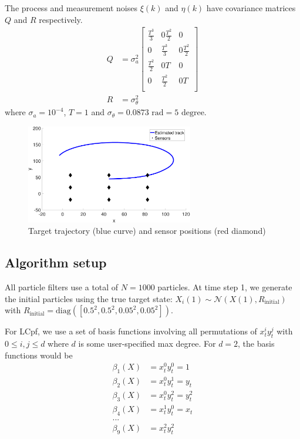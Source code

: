 \documentclass[10pt,letterpaper,final]{article}
\begin{document}
The process and measurement noises $\xi(k)$ and $\eta(k)$ have covariance matrices $Q$ and $R$ respectively.
\begin{align}
Q &= \sigma_a^2
\left[
\begin{array}{cccc}
\frac{T^3}{3} & 0 \frac{T^2}{2} & 0 \\
0 & \frac{T^3}{3} & 0 \frac{T^2}{2} \\
\frac{T^2}{2} & 0 T & 0 \\
0 & \frac{T^2}{2} & 0 T \\
\end{array}
\right]\\
R &= \sigma_{\theta}^2
\end{align}
where $\sigma_a=10^{-4}$, $T=1$ and $\sigma_{\theta}=0.0873\text{ rad} = 5 \text{ degree}$.

\begin{figure}
\centering
\includegraphics[width=0.65\textwidth]{Figures/track}
\caption{Target trajectory (blue curve) and sensor positions (red diamond)}
\label{fig:track}
\end{figure}

\subsection{Algorithm setup}
All particle filters use a total of $N=1000$ particles. At time step 1, we generate the initial particles using the true target state: $X_i(1) \sim \mathcal{N}(X(1), R_{\text{initial}})$ with $R_{\text{initial}}=\text{diag}([0.5^2,0.5^2,0.05^2,0.05^2])$. 

For LCpf, we use a set of basis functions involving all permutations of $x_t^iy_t^j$ with $0\leq i, j \leq d$ where $d$ is some user-specified max degree. For $d=2$, the basis functions would be
\begin{align*}
\beta_1(X) &= x_t^0 y_t^0 = 1 \\
\beta_2(X) &= x_t^0 y_t^1 = y_t \\
\beta_3(X) &= x_t^0 y_t^2 = y_t^2 \\
\beta_4(X) &= x_t^1 y_t^0 = x_t \\
... \\
\beta_9(X) &= x_t^2 y_t^2 
\end{align*}
\end{document}
